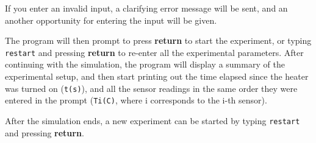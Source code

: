 If you enter an invalid input, a clarifying error message will be sent, and an
another opportunity for entering the input will be given.

The program will then prompt to press \textbf{return} to start the experiment,
or typing \texttt{restart} and pressing \textbf{return} to re-enter all the
experimental parameters. After continuing with the simulation, the program will
display a summary of the experimental setup, and then start printing out the
time elapsed since the heater was turned on (\texttt{t(s)}), and all the sensor
readings in the same order they were entered in the prompt (\texttt{Ti(C)},
where i corresponds to the i-th sensor).

After the simulation ends, a new experiment can be started by typing
\texttt{restart} and pressing \textbf{return}.

